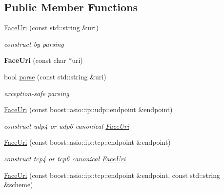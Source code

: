 \subsection*{Public Member Functions}
\begin{DoxyCompactItemize}
\item 
\hyperlink{classndn_1_1util_1_1FaceUri_aa9cf74ac424271ba9d70bbe965aa3f03}{Face\+Uri} (const std\+::string \&uri)
\begin{DoxyCompactList}\small\item\em construct by parsing \end{DoxyCompactList}\item 
{\bfseries Face\+Uri} (const char $\ast$uri)\hypertarget{classndn_1_1util_1_1FaceUri_ab0c7ca607793ef31fadafd36a0073a4b}{}\label{classndn_1_1util_1_1FaceUri_ab0c7ca607793ef31fadafd36a0073a4b}

\item 
bool \hyperlink{classndn_1_1util_1_1FaceUri_a8de2f092bd413574c654d60f4758dc51}{parse} (const std\+::string \&uri)\hypertarget{classndn_1_1util_1_1FaceUri_a8de2f092bd413574c654d60f4758dc51}{}\label{classndn_1_1util_1_1FaceUri_a8de2f092bd413574c654d60f4758dc51}

\begin{DoxyCompactList}\small\item\em exception-\/safe parsing \end{DoxyCompactList}\item 
\hyperlink{classndn_1_1util_1_1FaceUri_a2573a430c0093ca64acecc3a098fe109}{Face\+Uri} (const boost\+::asio\+::ip\+::udp\+::endpoint \&endpoint)\hypertarget{classndn_1_1util_1_1FaceUri_a2573a430c0093ca64acecc3a098fe109}{}\label{classndn_1_1util_1_1FaceUri_a2573a430c0093ca64acecc3a098fe109}

\begin{DoxyCompactList}\small\item\em construct udp4 or udp6 canonical \hyperlink{classndn_1_1util_1_1FaceUri}{Face\+Uri} \end{DoxyCompactList}\item 
\hyperlink{classndn_1_1util_1_1FaceUri_af9fcd83ababc9782cf8c1f5380436466}{Face\+Uri} (const boost\+::asio\+::ip\+::tcp\+::endpoint \&endpoint)\hypertarget{classndn_1_1util_1_1FaceUri_af9fcd83ababc9782cf8c1f5380436466}{}\label{classndn_1_1util_1_1FaceUri_af9fcd83ababc9782cf8c1f5380436466}

\begin{DoxyCompactList}\small\item\em construct tcp4 or tcp6 canonical \hyperlink{classndn_1_1util_1_1FaceUri}{Face\+Uri} \end{DoxyCompactList}\item 
\hyperlink{classndn_1_1util_1_1FaceUri_a95a5b41eb8787365a342591568f77ab3}{Face\+Uri} (const boost\+::asio\+::ip\+::tcp\+::endpoint \&endpoint, const std\+::string \&scheme)\hypertarget{classndn_1_1util_1_1FaceUri_a95a5b41eb8787365a342591568f77ab3}{}\label{classndn_1_1util_1_1FaceUri_a95a5b41eb8787365a342591568f77ab3}


\end{DoxyCompactItemize}
